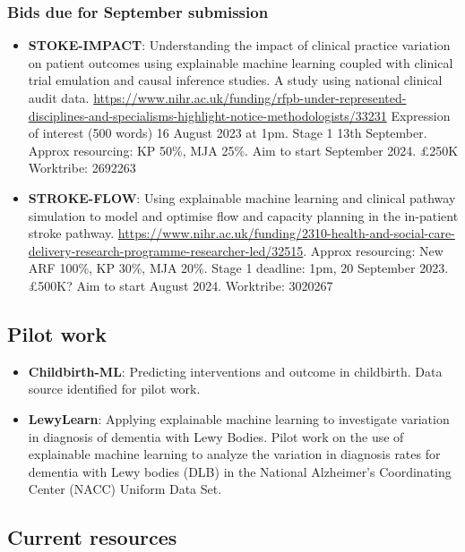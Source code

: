 \subsubsection{Bids due for September submission}

\begin{itemize}
    \item \textbf{STOKE-IMPACT}: Understanding the impact of clinical practice variation on patient outcomes using explainable machine learning coupled with clinical trial emulation and causal inference studies. A study using national clinical audit data. \url{https://www.nihr.ac.uk/funding/rfpb-under-represented-disciplines-and-specialisms-highlight-notice-methodologists/33231} Expression of interest (500 words) 16 August 2023 at 1pm. Stage 1 13th September. Approx resourcing: KP 50\%, MJA 25\%. Aim to start September 2024. £250K Worktribe: 2692263
    \item \textbf{STROKE-FLOW}: Using explainable machine learning and clinical pathway simulation to model and optimise flow and capacity planning in the in-patient stroke pathway. \url{https://www.nihr.ac.uk/funding/2310-health-and-social-care-delivery-research-programme-researcher-led/32515}. Approx resourcing: New ARF 100\%, KP 30\%, MJA 20\%. Stage 1 deadline: 1pm, 20 September 2023. £500K? Aim to start August 2024. Worktribe: 3020267
\end{itemize}

\subsection{Pilot work}

\begin{itemize}
    \item \textbf{Childbirth-ML}: Predicting interventions and outcome in childbirth. Data source identified for pilot work.
    
    \item \textbf{LewyLearn}: Applying explainable machine learning to investigate variation in diagnosis of dementia with Lewy Bodies. Pilot work on the use of explainable machine learning to analyze the variation in diagnosis rates for dementia with Lewy bodies (DLB) in the National Alzheimer’s Coordinating Center (NACC) Uniform Data Set.
    
\end{itemize}

\subsection{Current resources}

